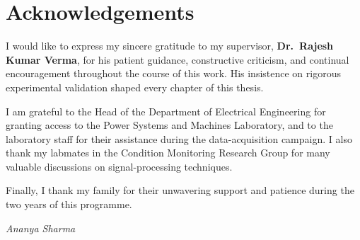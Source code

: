 \chapter*{Acknowledgements}

I would like to express my sincere gratitude to my supervisor, \textbf{Dr.\ Rajesh Kumar
Verma}, for his patient guidance, constructive criticism, and continual encouragement throughout
the course of this work. His insistence on rigorous experimental validation shaped every chapter
of this thesis.

I am grateful to the Head of the Department of Electrical Engineering for granting access to the
Power Systems and Machines Laboratory, and to the laboratory staff for their assistance during
the data-acquisition campaign. I also thank my labmates in the Condition Monitoring Research
Group for many valuable discussions on signal-processing techniques.

Finally, I thank my family for their unwavering support and patience during the two years of
this programme.

\begin{flushright}
\textit{Ananya Sharma}
\end{flushright}

\tableofcontents
\listoffigures
\listoftables
